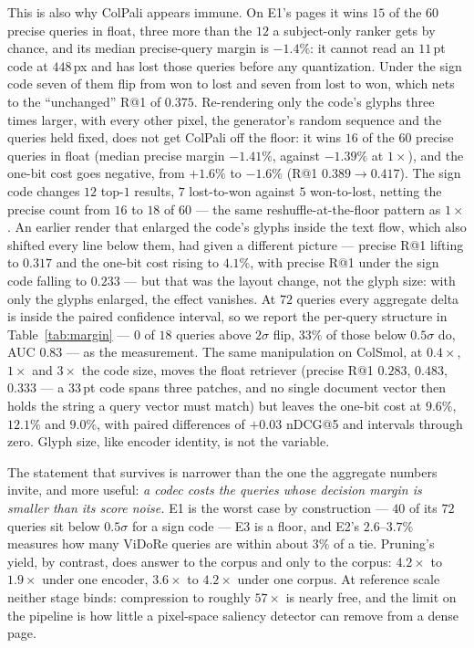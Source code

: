 \documentclass[conference]{IEEEtran}
\begin{document}
This is also why ColPali appears immune. On E1's pages it wins $15$ of the $60$
precise queries in float, three more than the $12$ a subject-only ranker gets by
chance, and its median precise-query margin is $-1.4\%$: it cannot read an
$11$\,pt code at $448$\,px and has lost those queries before any quantization.
Under the sign code seven of them flip from won to lost and seven from lost to
won, which nets to the ``unchanged'' R@1 of $0.375$. Re-rendering only the
code's glyphs three times larger, with every other pixel, the generator's
random sequence and the queries held fixed, does not get ColPali off the
floor: it wins $16$ of the $60$ precise queries in float (median precise
margin $-1.41\%$, against $-1.39\%$ at $1\times$), and the one-bit cost goes
negative, from $+1.6\%$ to $-1.6\%$ (R@1 $0.389 \to 0.417$). The sign code
changes $12$ top-$1$ results, $7$ lost-to-won against $5$ won-to-lost, netting
the precise count from $16$ to $18$ of $60$ --- the same reshuffle-at-the-floor
pattern as $1\times$. An earlier render that enlarged the code's glyphs inside
the text flow, which also shifted every line below them, had given a different
picture --- precise R@1 lifting to $0.317$ and the one-bit cost rising to
$4.1\%$, with precise R@1 under the sign code falling to $0.233$ --- but that
was the layout change, not the glyph size: with only the glyphs enlarged, the
effect vanishes. At $72$ queries every aggregate delta is inside the paired
confidence interval, so we report the per-query structure in
Table~\ref{tab:margin} --- $0$ of $18$ queries above $2\sigma$ flip, $33\%$ of
those below $0.5\sigma$ do, AUC $0.83$ --- as the measurement. The same
manipulation on ColSmol, at
$0.4\times$, $1\times$ and $3\times$ the code size, moves the float retriever
(precise R@1 $0.283$, $0.483$, $0.333$ --- a $33$\,pt code spans three patches,
and no single document vector then holds the string a query vector must match)
but leaves the one-bit cost at $9.6\%$, $12.1\%$ and $9.0\%$, with paired
differences of $+0.03$ nDCG@5 and intervals through zero. Glyph size, like
encoder identity, is not the variable.

The statement that survives is narrower than the one the aggregate numbers
invite, and more useful: \emph{a codec costs the queries whose decision margin is
smaller than its score noise.} E1 is the worst case by construction --- $40$ of
its $72$ queries sit below $0.5\sigma$ for a sign code --- E3 is a floor, and E2's
$2.6$--$3.7\%$ measures how many ViDoRe queries are within about $3\%$ of a tie.
Pruning's yield, by contrast, does answer to the corpus and only to the corpus:
$4.2\times$ to $1.9\times$ under one encoder, $3.6\times$ to $4.2\times$ under
one corpus. At reference scale neither stage binds: compression to roughly
$57\times$ is nearly free, and the limit on the pipeline is how little a
pixel-space saliency detector can remove from a dense page.
\end{document}
